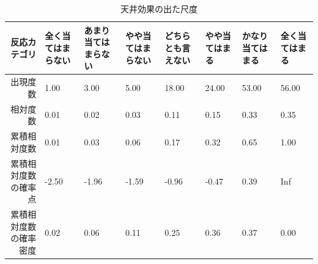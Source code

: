 \documentclass{ltjsbook}
\begin{document}
\begin{table}[ht]
    \centering
    \caption{天井効果の出た尺度}
    \begin{tabular}{rp{1.5cm}p{1.5cm}p{1.5cm}p{1.5cm}p{1.5cm}p{1.5cm}p{1.5cm}}
        \hline
        反応カテゴリ& \small{全く当てはまらない} & \small{あまり当てはまらない} & \small{やや当てはまらない} & \small{どちらとも言えない} & \small{やや当てはまる} & \small{かなり当てはまる} & \small{全く当てはまる} \\ 
         \hline
         出現度数 & 1.00 & 3.00 & 5.00 & 18.00 & 24.00 & 53.00 & 56.00 \\ 
         相対度数 & 0.01 & 0.02 & 0.03 & 0.11 & 0.15 & 0.33 & 0.35 \\ 
         累積相対度数 & 0.01 & 0.03 & 0.06 & 0.17 & 0.32 & 0.65 & 1.00 \\ 
         累積相対度数の確率点 & -2.50 & -1.96 & -1.59 & -0.96 & -0.47 & 0.39 & Inf \\ 
         累積相対度数の確率密度 & 0.02 & 0.06 & 0.11 & 0.25 & 0.36 & 0.37 & 0.00 \\ 
       \hline
    \end{tabular}
    \label{example2_1}
\end{table}
\end{document}
